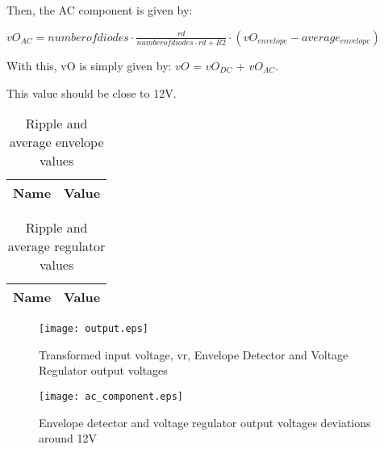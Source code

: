Then, the AC component is given by:

$vO_{AC} = number of diodes \cdot \frac{rd}{number of diodes \cdot rd+R2} \cdot (vO_{envelope}-average_{envelope})$

With this, vO is simply given by: $vO$ = $vO_{DC}$ + $vO_{AC}$.

This value should be close to 12V.

\begin{table}[ht]
  \centering
  \begin{tabular}{|l|r|}
    \hline    
    {\bf Name} & {\bf Value} \\ \hline
	
  \end{tabular}
  \caption{Ripple and average envelope values}
	\label{tab:envelope}
\end{table}

\begin{table}[ht]
  \centering
  \begin{tabular}{|l|r|}
    \hline    
    {\bf Name} & {\bf Value} \\ \hline
        
  \end{tabular}
  \caption{Ripple and average regulator values} 
        \label{tab:regulator}
\end{table}     





\begin{figure}[h] \centering
\texttt{[image: output.eps]}
	\caption{Transformed input voltage, vr, Envelope Detector and Voltage Regulator output voltages}
	\label{fig:output}
\end{figure}

\begin{figure}[h] \centering                                          
\texttt{[image: ac\_component.eps]}          
	\caption{Envelope detector and voltage regulator output voltages deviations around 12V}                                   
        \label{fig:ac_dc}                                            
\end{figure}








